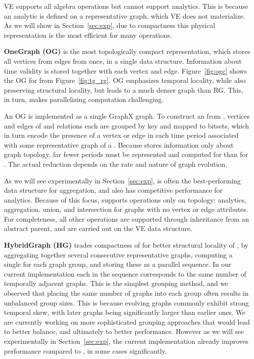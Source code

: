 
VE supports all \tg algebra operations but cannot support analytics.
This is because an analytic is defined on a representative graph,
which VE does not materialize.  As we will show in
Section~\ref{sec:exp}, due to compactness this physical representation
is the most efficient for many operations.

{\bf OneGraph (OG)} is the most topologically compact representation,
which stores all vertices from  edges from \tae once, in
a single data structure.  Information about time validity is stored
together with each vertex and edge.  Figure~\ref{fig:ogc} shows the OG
for  from Figure~\ref{fig:tg_rg}.  OG emphasizes temporal
locality, while also preserving structural locality, but leads to a
much denser graph than RG.  This, in turn, makes parallelizing
computation challenging.

An OG is implemented as a single GraphX graph.  To construct an \og
from \tve, vertices and edges of \tv and \te relations each are
grouped by key and mapped to bitsets, which in turn encode the
presence of a vertex or edge in each time period associated with some
representative graph of a \tg.  Because \og stores information only
about graph topology, far fewer periods must be represented and
computed for \og than for \rg.  The actual reduction depends on the
rate and nature of graph evolution.

As we will see experimentally in Section~\ref{sec:exp}, \og is often
the best-performing data structure for aggregation, and also has
competitive performance for analytics.  Because of this focus, \og
supports operations only on topology: analytics, aggregation. union,
and intersection for graphs with no vertex or edge attributes.  For
completeness, all other operations are supported through inheritance
from an abstract parent, and are carried out on the VE data structure.

{\bf HybridGraph (HG)} trades compactness of \og for better structural
locality of \rg, by aggregating together several consecutive
representative graphs, computing a single \og for each graph group,
and storing these as a parallel sequence.  In our current
implementation each \og in the sequence corresponds to the same number
of temporally adjacent graphs.
%
This is the simplest grouping method, and we observed that placing the
same number of graphs into each group often results in unbalanced
group sizes.  This is because evolving graphs commonly exhibit strong
temporal skew, with later graphs being significantly larger than earlier
ones.  We are currently working on more sophisticated grouping
approaches that would lead to better balance, and ultimately to better
performance.  However as we will see experimentally in
Section~\ref{sec:exp}, the current \hg implementation already improves
performance compared to \og, in some cases significantly.

